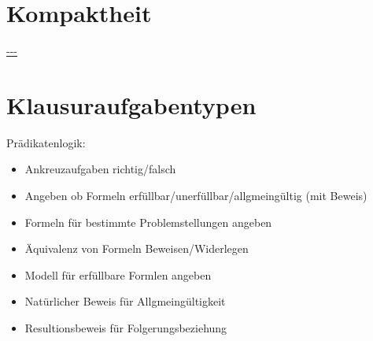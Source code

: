 \documentclass[twocolumn]{article}
\begin{document}
    \section{Kompaktheit}
    \url{---}\\


    \section{Klausuraufgabentypen}
    Prädikatenlogik:
    \begin{itemize}
        \item Ankreuzaufgaben richtig/falsch
        \item Angeben ob Formeln erfüllbar/unerfüllbar/allgmeingültig (mit Beweis)
        \item Formeln für bestimmte Problemstellungen angeben
        \item Äquivalenz von Formeln Beweisen/Widerlegen
        \item Modell für erfüllbare Formlen angeben
        \item Natürlicher Beweis für Allgmeingültigkeit
        \item Resultionsbeweis für Folgerungsbeziehung
    \end{itemize}
\end{document}
